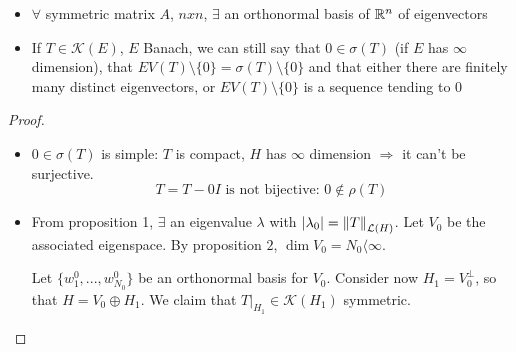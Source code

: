 \begin{remark}
    \begin{itemize}
        \item \(\forall\) symmetric matrix \(A\), \(n x n \), \(\exists\) an orthonormal basis of \(\mathbb{R}^n\) of eigenvectors
        \item If \(T \in \mathcal{K}(E)\), \(E\) Banach, we can still say that \(0 \in \sigma(T)\) (if \(E\) has \(\infty\) dimension), that \(EV(T) \setminus \{0\} = \sigma(T) \setminus \{0\}\) and that either there are finitely many distinct eigenvectors, or \(EV(T) \setminus \{0\}\) is a sequence tending to \(0\)
    \end{itemize}
\end{remark}

\begin{proof}
    \begin{itemize}
        \item \(0 \in \sigma(T)\) is simple: \(T \) is compact, \(H\) has \(\infty\) dimension \(\Rightarrow\) it can't be surjective.
        \[
            T = T - 0 I \text{ is not bijective: } 0 \notin \rho(T)
        \]
        \item From proposition 1, \(\exists \) an eigenvalue \(\lambda\) with \(\abs{\lambda_0} = \norm{T}_{\mathcal{L}(H)}\). Let \(V_0\) be the associated eigenspace. By proposition \(2\), \(\dim V_0 = N_0 \langle \infty\).
        
        Let \(\{w_1^0, ..., w_{N_0}^0\}\) be an orthonormal basis for \(V_0\). Consider now \(H_1 = V_0^\perp\), so that \(H = V_0 \oplus H_1\). We claim that \(T|_{H_1} \in \mathcal{K}(H_1)\) symmetric. 


\end{itemize}
\end{proof}
